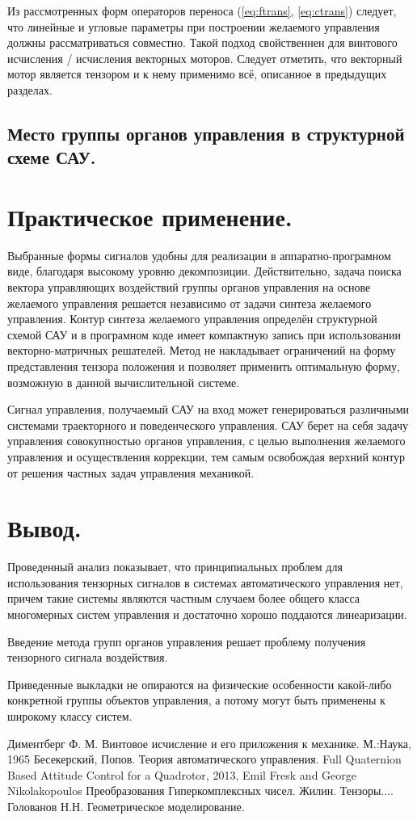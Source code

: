 \documentclass[a4paper]{article}
\begin{document}
Из рассмотренных форм операторов переноса (\ref{eq:ftrans}, \ref{eq:ctrans}) следует, что линейные и угловые параметры при построении желаемого управления должны рассматриваться совместно. Такой подход свойственнен для винтового исчисления / исчисления векторных моторов. Следует отметить, что векторный мотор является тензором и к нему применимо всё, описанное в предыдущих разделах.  

\subsection{Место группы органов управления в структурной схеме САУ.}

\section{Практическое применение.}
Выбранные формы сигналов удобны для реализации в аппаратно-програмном виде, благодаря высокому уровню декомпозиции. Действительно, задача поиска вектора управляющих воздействий группы органов управления на основе желаемого управления решается независимо от задачи синтеза желаемого управления. Контур синтеза желаемого управления определён структурной схемой САУ и в програмном коде имеет компактную запись при использовании векторно-матричных решателей. Метод не накладывает ограничений на форму представления тензора положения и позволяет применить оптимальную форму, возможную в данной вычислительной системе.

Сигнал управления, получаемый САУ на вход может генерироваться различными системами траекторного и поведенческого управления. САУ берет на себя задачу управления совокупностью органов управления, с целью выполнения желаемого управления и осуществления коррекции, тем самым освобождая верхний контур от решения частных задач управления механикой.

\section{Вывод.}
Проведенный анализ показывает, что принципиальных проблем для использования тензорных сигналов в системах автоматического управления нет, причем такие системы являются частным случаем более общего класса многомерных систем управления и достаточно хорошо поддаются линеаризации. 

Введение метода групп органов управления решает проблему получения тензорного сигнала воздействия.

Приведенные выкладки не опираются на физические особенности какой-либо конкретной группы объектов управления, а потому могут быть применены к широкому классу систем. 



\begin{thebibliography}{9}
 Диментберг Ф. М. Винтовое исчисление и его приложения к механике. М.:Наука, 1965
 Бесекерский, Попов. Теория автоматического управления.
 Full Quaternion Based Attitude Control for a Quadrotor, 2013, Emil Fresk and George Nikolakopoulos
 Преобразования Гиперкомплексных чисел.
 Жилин. Тензоры....
 Голованов Н.Н. Геометрическое моделирование.
\end{thebibliography}
\end{document}
